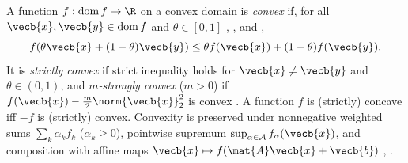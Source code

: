 \documentclass[../../../../master.tex]{subfiles}
\begin{document}
A function $f : \operatorname{dom} f \to \R$ on a convex domain is \emph{convex} if, for all $\vecb{x}, \vecb{y} \in \operatorname{dom} f$ and $\theta \in [0, 1]$ , , and ,
\begin{equation}
  f(\theta\vecb{x} + (1 - \theta)\vecb{y}) \le \theta f(\vecb{x}) + (1 - \theta) f(\vecb{y}).
  \label{eq:convex:chord_def}
\end{equation}
It is \emph{strictly convex} if strict inequality holds for $\vecb{x} \neq \vecb{y}$ and $\theta \in (0, 1)$, and \emph{$m$-strongly convex} ($m > 0$) if $f(\vecb{x}) - \frac{m}{2}\norm{\vecb{x}}_2^2$ is convex . A function $f$ is (strictly) concave iff $-f$ is (strictly) convex. Convexity is preserved under nonnegative weighted sums $\sum_k \alpha_k f_k$ ($\alpha_k \ge 0$), pointwise supremum $\sup_{\alpha \in \mathcal{A}} f_\alpha(\vecb{x})$, and composition with affine maps $\vecb{x} \mapsto f(\mat{A}\vecb{x} + \vecb{b})$ , .
\end{document}
